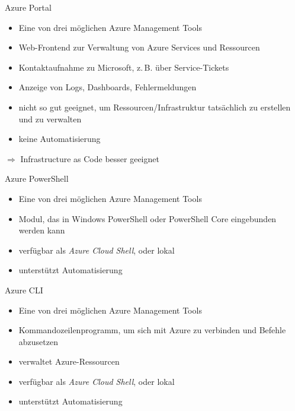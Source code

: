 
\begin{flashcard}[\ ]{Azure Portal}
    \begin{itemize}
        \item Eine von drei möglichen Azure Management Tools
        \item Web-Frontend zur Verwaltung von Azure Services und Ressourcen
        \item Kontaktaufnahme zu Microsoft, z.\,B. über Service-Tickets
        \item Anzeige von Logs, Dashboards, Fehlermeldungen
        \item nicht so gut geeignet, um Ressourcen/Infrastruktur tatsächlich zu erstellen und zu verwalten
        \item keine Automatisierung
    \end{itemize}
    $\Rightarrow$ Infrastructure as Code besser geeignet

\end{flashcard}

\begin{flashcard}[\ ]{Azure PowerShell}
    \begin{itemize}
        \item Eine von drei möglichen Azure Management Tools
        \item Modul, das in Windows PowerShell oder PowerShell Core eingebunden werden kann
        \item verfügbar als \emph{Azure Cloud Shell}, oder lokal
        \item unterstützt Automatisierung
    \end{itemize}
\end{flashcard}

\begin{flashcard}[Definition]{Azure CLI}
    \begin{itemize}
        \item Eine von drei möglichen Azure Management Tools
        \item Kommandozeilenprogramm, um sich mit Azure zu verbinden und Befehle abzusetzen
        \item verwaltet Azure-Ressourcen
        \item verfügbar als \emph{Azure Cloud Shell}, oder lokal
        \item unterstützt Automatisierung
    \end{itemize}
\end{flashcard}

